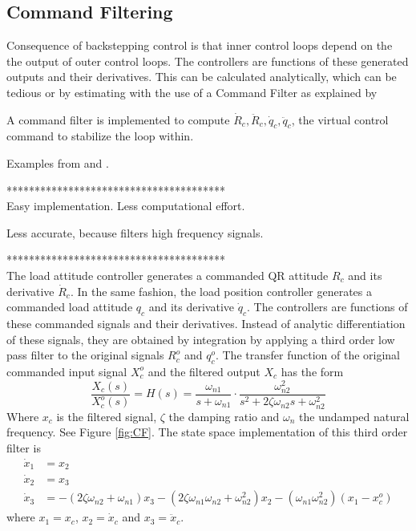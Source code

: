 

\subsection{Command Filtering}
Consequence of backstepping control is that inner control loops depend on the the output of outer control loops. The controllers are functions of these generated outputs and their derivatives. This can be calculated analytically, which can be tedious or by estimating with the use of a Command Filter as explained by \cite{Djapic} 

A command filter is implemented to compute $ \dot{R}_c, \ddot{R}_c,\dot{q}_c, \ddot{q}_c $, the virtual control command to stabilize the loop within. \cite{Farrell2009}

Examples from \cite{Farrell2008} and \cite{Djapic2008}. 

***************************************\\
Easy implementation. Less computational effort.

Less accurate, because filters high frequency signals.

***************************************\\

The load attitude controller generates a commanded QR attitude $ R_c $ and its derivative $ \dot{R}_c $. In the same fashion, the load position controller generates a commanded load attitude $ q_c $ and its derivative $ \dot{q}_c $. The controllers are functions of these commanded signals and their derivatives. Instead of analytic differentiation of these signals, they are obtained by integration by applying a third order low pass filter to the original signals $ R_c^o $ and $ q_c^o $. The transfer function of the original commanded input signal $ X_c^o $ and the filtered output $ X_c $ has the form
\begin{equation}\label{key}
\frac{X_c(s)}{X_c^o(s)}=H(s)=\frac{\omega_{n1}}{s+\omega_{n1}}\cdot\frac{\omega_{n2}^2}{s^2+2\zeta\omega_{n2}s+\omega_{n2}^2}
\end{equation}
Where $ x_c $ is the filtered signal, $ \zeta $ the damping ratio and $ \omega_n $ the undamped natural frequency. See Figure \ref{fig:CF}.
The state space implementation of this third order filter is \cite{Djapic2008}
\begin{align}\label{key}
\dot{x}_1 &= x_2\\ %
\dot{x}_2 &= x_3\\ %
\dot{x}_3 &= -(2\zeta \omega_{n2}+\omega_{n1})x_3-(2\zeta\omega_{n1}\omega_{n2}+\omega_{n2}^2)x_2-(\omega_{n1}\omega_{n2}^2)(x_1-x_c^o)
\end{align}
where $ x_1 = x_c$, $ x_2 = \dot{x}_c$ and $ x_3 = \ddot{x}_c$. 

